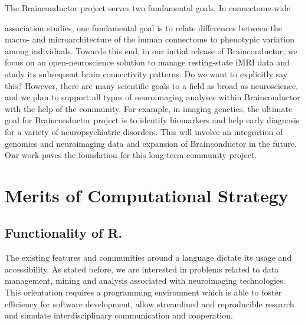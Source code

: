 \documentclass{nature}
\begin{document}
The Brainconductor project serves two fundamental goals. In connectome-wide

association studies, one fundamental goal is to relate differences between the
macro- and microarchitecture of the human connectome to phenotypic variation among
individuals\cite{milham2012open}. Towards this end,
in our initial release of Brainconductor, we focus on an open-neuroscience
solution to manage resting-state fMRI data and study its
subsequent brain connectivity patterns. {\color{red}Do we want to explicitly say
this?}
However, there are many scientific goals to a field as broad as neuroscience,
and we plan to support all types of neuroimaging analyses within Brainconductor
with the help of the community.
For example, in imaging genetics, the ultimate goal
for Brainconductor project is to identify biomarkers and help early diagnosis
for a variety of neuropsychiatric disorders. This will involve an
integration of genomics and neuroimaging data and expansion of Brainconductor
in the future. Our work paves the foundation for this long-term community 
project.


\section{Merits of Computational Strategy}

\subsection{Functionality of R.}
The existing features and communities around a language dictate
its usage and accessibility. As stated before, we are
interested in problems related to data management, mining and analysis
associated with neuroimaging technologies. This orientation requires
a programming environment which is able to foster
efficiency for software development, allow
streamlined and reproducible research and simulate
interdisciplinary communication and cooperation.
\end{document}
